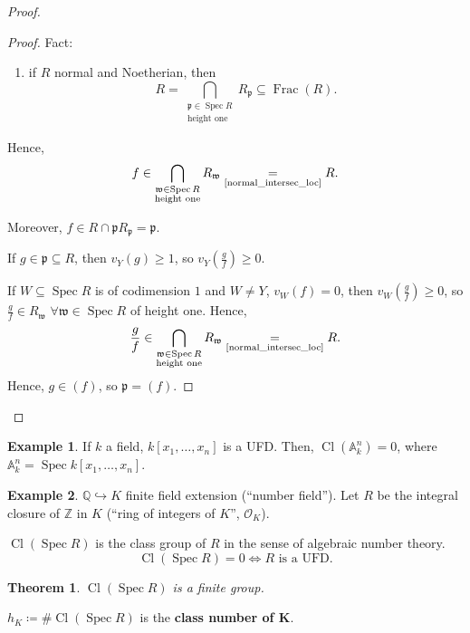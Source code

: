 \documentclass[12pt]{article}
\DeclareMathOperator{\Spec}{Spec}
\DeclareMathOperator{\Frac}{Frac}
\DeclareMathOperator{\Cl}{Cl}
\newtheorem*{theorem}{Theorem}
\theoremstyle{definition}
\newtheorem*{example}{Example}
\begin{document}
\begin{proof}
\begin{itemize}
\begin{proof}
Fact:
\begin{enumerate}[resume,label=(\roman*)]
\item\label{normal_intersec_loc} if $R$ normal and Noetherian, then
\[R=\bigcap_{\substack{\mathfrak{p}\in\Spec R\\\text{height one}}}R_{\mathfrak{p}}\subseteq\Frac(R).\]
\end{enumerate}

Hence,
\[f\in\bigcap_{\substack{\mathfrak{w}\in\Spec R\\\text{height one}}}R_{\mathfrak{w}}\underset{\text{\ref{normal_intersec_loc}}}{=}R.\]

Moreover, $f\in R\cap\mathfrak{p}R_{\mathfrak{p}}=\mathfrak{p}$.

If $g\in\mathfrak{p}\subseteq R$, then $v_Y(g)\geq1$, so $v_Y(\frac{g}{f})\geq0$.

If $W\subseteq\Spec R$ is of codimension $1$ and $W\neq Y$, $v_W(f)=0$, then $v_W(\frac{g}{f})\geq0$, so $\frac{g}{f}\in R_{\mathfrak{w}}$ $\forall\mathfrak{w}\in\Spec R$ of height one. Hence,
\[\frac{g}{f}\in\bigcap_{\substack{\mathfrak{w}\in\Spec R\\\text{height one}}}R_{\mathfrak{w}}\underset{\text{\ref{normal_intersec_loc}}}{=}R.\]
Hence, $g\in(f)$, so $\mathfrak{p}=(f)$.
\end{proof}
\end{itemize}
\end{proof}

\begin{example}
If $k$ a field, $k[x_1,\ldots,x_n]$ is a UFD. Then, $\Cl(\mathbb{A}_k^n)=0$, where $\mathbb{A}_k^n=\Spec k[x_1,\ldots,x_n]$.
\end{example}

\begin{example}
$\mathbb{Q}\hookrightarrow K$ finite field extension (``number field''). Let $R$ be the integral closure of $\mathbb{Z}$ in $K$ (``ring of integers of $K$'', $\mathcal{O}_K$).

$\Cl(\Spec R)$ is the class group of $R$ in the sense of algebraic number theory.
\[\Cl(\Spec R)=0\Longleftrightarrow R\text{ is a UFD}.\]

\begin{theorem}
$\Cl(\Spec R)$ is a finite group.
\end{theorem}

$h_K\coloneqq\#\Cl(\Spec R)$ is the \textbf{class number of $\boldsymbol{K}$}.
\end{example}
\end{document}
